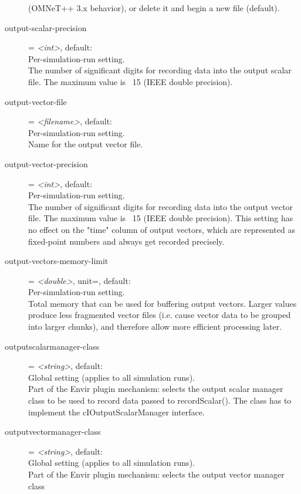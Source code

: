 \begin{description}
    (OMNeT++ 3.x behavior), or delete it and begin a new file (default).
\item[output-scalar-precision] = \textit{<int>}, default: \\
    Per-simulation-run setting.\\
    The number of significant digits for recording data into the output scalar
    file. The maximum value is ~15 (IEEE double precision).
\item[output-vector-file] = \textit{<filename>}, default: \\
    Per-simulation-run setting.\\
    Name for the output vector file.
\item[output-vector-precision] = \textit{<int>}, default: \\
    Per-simulation-run setting.\\
    The number of significant digits for recording data into the output vector
    file. The maximum value is ~15 (IEEE double precision). This setting has no
    effect on the "time" column of output vectors, which are represented as
    fixed-point numbers and always get recorded precisely.
\item[output-vectors-memory-limit] = \textit{<double>}, unit=, default: \\
    Per-simulation-run setting.\\
    Total memory that can be used for buffering output vectors. Larger values
    produce less fragmented vector files (i.e. cause vector data to be grouped
    into larger chunks), and therefore allow more efficient processing later.
\item[outputscalarmanager-class] = \textit{<string>}, default: \\
    Global setting (applies to all simulation runs).\\
    Part of the Envir plugin mechanism: selects the output scalar manager class
    to be used to record data passed to recordScalar(). The class has to
    implement the cIOutputScalarManager interface.
\item[outputvectormanager-class] = \textit{<string>}, default: \\
    Global setting (applies to all simulation runs).\\
    Part of the Envir plugin mechanism: selects the output vector manager class

\end{description}
